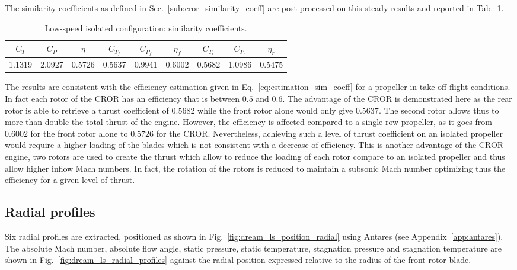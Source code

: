 The similarity coefficients as defined in 
Sec.~\ref{sub:cror_similarity_coeff} are post-processed on
this steady results and reported in Tab.~\ref{tab:dream_ls_sim_coeff}.
\begin{table}
   \centering
  \begin{tabular}{ccc|cccccc}
    \toprule
    $C_T$ & $C_P$ & $\eta$ & $C_{T_f}$ & $C_{P_f}$ & $\eta_f$ & $C_{T_r}$ & $C_{P_r}$ & $\eta_r$ \\
    \midrule
    1.1319 & 2.0927 & 0.5726 & 0.5637 & 0.9941 &  0.6002 & 0.5682 & 1.0986 &  0.5475 \\
    \bottomrule
  \end{tabular}
  \caption{Low-speed isolated configuration: similarity coefficients.}
  \label{tab:dream_ls_sim_coeff}
\end{table}
The results are consistent with the efficiency estimation given in 
Eq.~\eqref{eq:estimation_sim_coeff} for a propeller in take-off flight conditions.
In fact each rotor of the CROR has an efficiency that is between $0.5$
and $0.6$. The advantage of the CROR is demonstrated here as the rear
rotor is able to retrieve a thrust coefficient of $0.5682$ while
the front rotor alone would only give $0.5637$.
The second rotor allows thus to more than double the total thrust of the engine.
However, the efficiency is affected compared to a single row 
propeller, as
it goes from $0.6002$ for the front rotor alone to $0.5726$ for the CROR.
Nevertheless, achieving such a level of thrust coefficient on an isolated
propeller would require a higher loading of the blades which is not
consistent with a decrease of efficiency.
This is another advantage 
of the CROR engine, two rotors are used to create the thrust which allow to
reduce the loading of each rotor compare to an isolated propeller and thus
allow higher inflow Mach numbers. In fact, the rotation of the rotors is reduced 
to maintain a subsonic Mach number optimizing thus the efficiency
for a given level of thrust.


\subsection{Radial profiles}
\label{sub:dream_ls_radial_profiles}

Six radial profiles are extracted,
positioned as shown in Fig.~\ref{fig:dream_ls_position_radial}
using Antares (see Appendix~\ref{app:antares}). The absolute
Mach number, absolute flow angle, static pressure, static
temperature, stagnation pressure and stagnation temperature
are shown in Fig.~\ref{fig:dream_ls_radial_profiles}
against the radial position expressed
relative to the radius of the front rotor blade.

